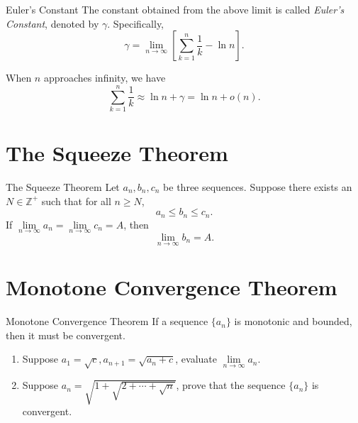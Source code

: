 \begin{definition}{Euler's Constant}{}
  The constant obtained from the above limit is called \emph{Euler's Constant},
  denoted by $\gamma$. Specifically,
  \begin{equation}
    \gamma = \lim \limits _{n \rightarrow \infty} \left[ \sum\limits_{k = 1}^n \frac{1}{k} - \ln n \right].
  \end{equation}
\end{definition}

\begin{corollary}{}{}
  When $n$ approaches infinity, we have
  \begin{equation}
    \sum\limits_{k = 1}^n \frac{1}{k} \approx \ln n + \gamma = \ln n + o(n).
  \end{equation}
\end{corollary}

\section{The Squeeze Theorem}

\begin{theorem}{The Squeeze Theorem}{}
  Let $a_n, b_n, c_n$ be three sequences.
  Suppose there exists an $N \in \mathbb{Z}^+$ such that for all $n \geq N$,
  \begin{equation}
    a_n \leq b_n \leq c_n.
  \end{equation}
  If $\lim \limits _{n \rightarrow \infty} a_n = \lim \limits _{n \rightarrow
    \infty} c_n = A$,
  then 
  \begin{equation}
    \lim \limits _{n \rightarrow \infty} b_n = A.
  \end{equation}
\end{theorem}

\section{Monotone Convergence Theorem}

\begin{theorem}{Monotone Convergence Theorem}{}
  If a sequence $\{a_n\}$ is monotonic and bounded,
  then it must be convergent.
\end{theorem}

\begin{example}{}{}
  \begin{enumerate}
  \item Suppose $a_1 = \sqrt{c}, a_{n+1} = \sqrt{a_n + c}$, evaluate $\lim \limits _{n \rightarrow \infty} a_n$.
  \item Suppose $a_n = \sqrt{1 + \sqrt{2 + \cdots + \sqrt{n}}}$,
    prove that the sequence $\{a_n\}$ is convergent.
  \end{enumerate}
\end{example}

